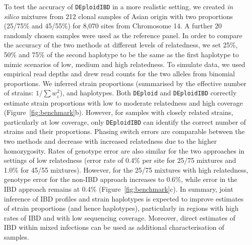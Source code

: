 \documentclass[9pt,lineno]{elife}
\begin{document}
To test the accuracy of \texttt{DEploidIBD} in a more realistic setting, we created {\it in silico} mixtures from 212 clonal samples of Asian origin with two proportions (25/75\% and 45/55\%) for 8,070 sites from Chromosome 14.  A further 20 randomly chosen samples were used as the reference panel. In order to compare the accuracy of the two methods at different levels of relatedness, we set 25\%, 50\% and 75\% of the second haplotype to be the same as the first haplotype to mimic scenarios of low, medium and high relatedness. To simulate data, we used empirical read depths and drew read counts for the two alleles from binomial proportions.  We inferred strain proportions (summarised by the effective number of strains: $1/\sum w_{i}^{2}$), and haplotypes.  Both \texttt{DEploid} and \texttt{DEploidIBD} correctly estimate strain proportions with low to moderate relatedness and high coverage (Figure~\ref{fig:benchmark}b).  However, for samples with closely related strains, particularly at low coverage, only \texttt{DEploidIBD} can identify the correct number of strains and their proportions.  Phasing switch errors are comparable between the two methods and decrease with increased relatedness due to the higher homozygosity.  Rates of genotype error are also similar for the two approaches in settings of low relatedness (error rate of 0.4\% per site for 25/75 mixtures and 1.0\% for 45/55 mixtures).  However, for the 25/75 mixtures with high relatedness, genotype error for the non-IBD approach increases to 0.6\%, while error in the IBD approach remains at 0.4\% (Figure~\ref{fig:benchmark}c).  In summary, joint inference of IBD profiles and strain haplotypes is expected to improve estimates of strain proportions (and hence haplotypes), particularly in regions with high rates of IBD and with low sequencing coverage.  Moreover, direct estimates of IBD within mixed infections can be used as additional characterisation of samples.
\end{document}
